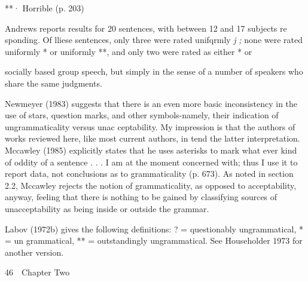 \begin{styleStandard}
**· Horrible (p. 203)
\end{styleStandard}


\begin{styleStandard}
Andrews reports results for 20 sentences, with between 12 and 17 subjects re\- sponding. Of lliese sentences, only three were rated unifqrmly \textit{{\textquotedbl}j}\textit{ }\textit{{\textquotedbl}}\textit{;}\textit{ }none were rated uniformly {\textquotedbl}*{\textquotedbl} or uniformly {\textquotedbl}**,{\textquotedbl} and only two were rated as either {\textquotedbl}*{\textquotedbl} or
\end{styleStandard}


\begin{styleStandard}
socially based group speech, but simply in the sense of a number of speakers who share the same judgments.
\end{styleStandard}


\setcounter{listWWNumlxleveli}{14}
\begin{listWWNumlxleveli}
\item 
\begin{styleStandard}
Newmeyer (1983) suggests that there is an even more basic inconsistency in the use of stars, question marks, and other symbols-namely, their indication of ungrammaticality versus unac\- ceptability. My impression is that the authors of works reviewed here, like most current authors, in\- tend the latter interpretation. Mccawley (1985) explicitly states that he uses asterisks to mark {\textquotedbl}what\- ever kind of oddity of a sentence . . . I am at the moment concerned with; thus I use it to report data, not conclusions as to {\textquotesingle}grammaticality{\textquotesingle}{\textquotedbl} (p. 673). As noted in section 2.2, Mccawley rejects the notion of grammaticality, as opposed to acceptability, anyway, feeling that there is nothing to be gained by classifying sources of unacceptability as being inside or outside the grammar.
\end{styleStandard}


\item 
\begin{styleStandard}
Labov (1972b) gives the following definitions: ? = questionably ungrammatical, * = un\- grammatical, ** = outstandingly ungrammatical. See Householder 1973 for another version.
\end{styleStandard}


\end{listWWNumlxleveli}
\clearpage\setcounter{page}{1}\begin{styleStandard}
46\ \ Chapter Two
\end{styleStandard}


